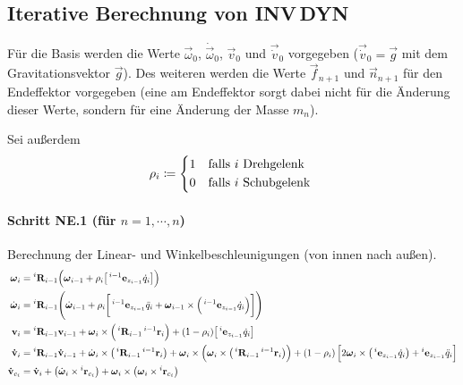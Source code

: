 		\subsection{Iterative Berechnung von INV\,DYN}
			Für die Basis werden die Werte \( \vec{\omega}_0 \), \( \dot{\vec{\omega}}_0 \), \( \vec{v}_0 \) und \( \vec{\dot{v}}_0 \) vorgegeben (\zB \( \vec{\dot{v}}_0 = \vec{g} \) mit dem Gravitationsvektor \(\vec{g}\)). Des weiteren werden die Werte \( \vec{f}_{n + 1} \) und \( \vec{n}_{n + 1} \) für den Endeffektor vorgegeben (eine am Endeffektor sorgt dabei nicht für die Änderung dieser Werte, sondern für eine Änderung der Masse \(m_n\)).
			
			Sei außerdem
			\begin{equation*}
				\rho_i \coloneqq
					\begin{cases*}
						1 & falls \(i\) Drehgelenk \\
						0 & falls \(i\) Schubgelenk
					\end{cases*}
			\end{equation*}
			
			\paragraph{Schritt NE.1 (für \( n = 1, \cdots, n \))}
				Berechnung der Linear- und Winkelbeschleunigungen (von innen nach außen).
				\begin{align*}
					\boldsymbol{\mathrm{\omega}}_i &= \prescript{i}{}{\boldsymbol{\mathrm{R}}}_{i - 1} \Big( \boldsymbol{\mathrm{\omega}}_{i - 1} + \rho_i \big[ \prescript{i - 1}{}{\boldsymbol{\mathrm{e}}}_{z_{i - 1}} \dot{q}_i \big] \Big) \\
					\dot{\boldsymbol{\mathrm{\omega}}}_i &= \prescript{i}{}{\boldsymbol{\mathrm{R}}}_{i - 1} \Bigg( \dot{\boldsymbol{\mathrm{\omega}}}_{i - 1} + \rho_i \bigg[ \prescript{i - 1}{}{\boldsymbol{\mathrm{e}}}_{z_{i - 1}} \ddot{q}_i + \boldsymbol{\mathrm{\omega}}_{i - 1} \times \Big( \prescript{i - 1}{}{\boldsymbol{\mathrm{e}}}_{z_{i - 1}} \dot{q}_i \Big) \bigg] \Bigg) \\
					\boldsymbol{\mathrm{v}}_i &= \prescript{i}{}{\boldsymbol{\mathrm{R}}}_{i - 1} \boldsymbol{\mathrm{v}}_{i - 1} + \boldsymbol{\mathrm{\omega}}_i \times \Big( \prescript{i}{}{\boldsymbol{\mathrm{R}}}_{i - 1} \prescript{i - 1}{}{\boldsymbol{\mathrm{r}}}_i \Big) + (1 - \rho_i) \big[ \prescript{i}{}{\boldsymbol{\mathrm{e}}}_{z_{i - 1}} \dot{q}_i \big] \\
					\boldsymbol{\mathrm{\dot{v}}}_i &= \prescript{i}{}{\boldsymbol{\mathrm{R}}}_{i - 1} \boldsymbol{\mathrm{\dot{v}}}_{i - 1} + \dot{\boldsymbol{\mathrm{\omega}}}_i \times \big( \prescript{i}{}{\boldsymbol{\mathrm{R}}}_{i - 1} \prescript{i - 1}{}{\boldsymbol{\mathrm{r}}}_i \big) + \boldsymbol{\mathrm{\omega}}_i \times \Big( \boldsymbol{\mathrm{\omega}}_i \times \big( \prescript{i}{}{\boldsymbol{\mathrm{R}}}_{i - 1} \prescript{i - 1}{}{\boldsymbol{\mathrm{r}}}_i \big) \Big) + (1 - \rho_i) \, \Big[ 2\boldsymbol{\mathrm{\omega}}_i \times \big( \prescript{i}{}{\boldsymbol{\mathrm{e}}}_{z_{i - 1}} \dot{q}_i \big) + \prescript{i}{}{\boldsymbol{\mathrm{e}}}_{z_{i - 1}} \ddot{q}_i \Big] \\
					\boldsymbol{\mathrm{\dot{v}}}_{c_i} &= \boldsymbol{\mathrm{\dot{v}}}_i + \big(\dot{\boldsymbol{\mathrm{\omega}}}_i \times \prescript{i}{}{\boldsymbol{\mathrm{r}}}_{c_i}\big) + \boldsymbol{\mathrm{\omega}}_i \times \big( \boldsymbol{\mathrm{\omega}}_i \times \prescript{i}{}{\boldsymbol{\mathrm{r}}}_{c_i} \big)
				\end{align*}
			
